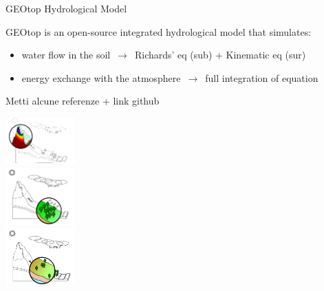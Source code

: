 \documentclass[ignorenonframetext,]{beamer}
\begin{document}
\begin{frame}{GEOtop Hydrological Model}

GEOtop is an open-source integrated hydrological model that simulates:

\begin{itemize}
\item water flow in the soil $\,\to\,$ Richards' eq (sub) + Kinematic eq (sur)
\item energy exchange with the atmosphere $\,\to\,$ full integration of equation
\end{itemize}

Metti alcune referenze + link github

\includegraphics[width=0.20000\textwidth]{resources/images/geotop_snow.png}\\
\includegraphics[width=0.20000\textwidth]{resources/images/geotop_vegetation.png}\\
\includegraphics[width=0.20000\textwidth]{resources/images/geotop_infiltration.png}\\

\end{frame}
\end{document}
